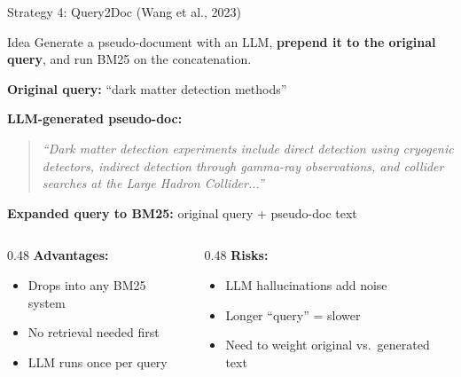 \documentclass[aspectratio=169]{beamer}
\begin{document}
\begin{frame}[shrink=10]{Strategy 4: Query2Doc (Wang et al., 2023)}
\begin{block}{Idea}
Generate a pseudo-document with an LLM, \textbf{prepend it to the original query}, and run BM25 on the concatenation.
\end{block}

\vspace{0.5em}

\textbf{Original query:} ``dark matter detection methods''

\textbf{LLM-generated pseudo-doc:}
\begin{quote}
\small\itshape
``Dark matter detection experiments include direct detection using cryogenic detectors, indirect detection through gamma-ray observations, and collider searches at the Large Hadron Collider...''
\end{quote}

\textbf{Expanded query to BM25:} original query + pseudo-doc text

\vspace{0.5em}

\begin{columns}
\begin{column}{0.48\textwidth}
\textbf{\textcolor{green}{\checkmark} Advantages:}
\begin{itemize}
    \item Drops into any BM25 system
    \item No retrieval needed first
    \item LLM runs once per query
\end{itemize}
\end{column}
\begin{column}{0.48\textwidth}
\textbf{\textcolor{red}{} Risks:}
\begin{itemize}
    \item LLM hallucinations add noise
    \item Longer ``query'' = slower
    \item Need to weight original vs.\ generated text
\end{itemize}
\end{column}
\end{columns}
\end{frame}
\end{document}

